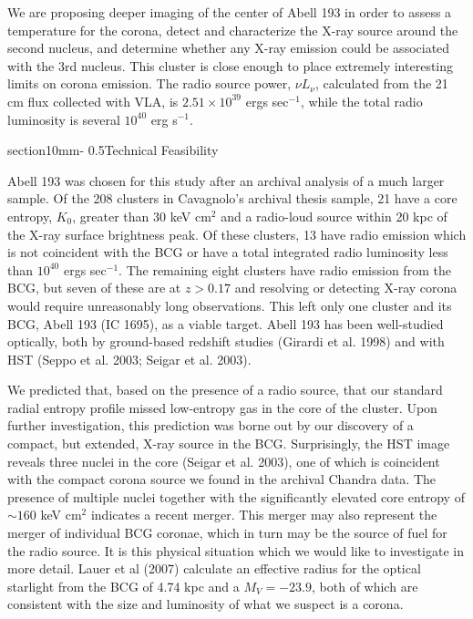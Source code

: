 \documentclass[letterpaper,11pt]{article}
\makeatletter
\renewcommand{\section}{\@startsection%
{section}{1}{0mm}{-\baselineskip}%
{0.5\baselineskip}{\normalfont\Large\bfseries}}%
\makeatother
\begin{document}
We are proposing deeper imaging of the center of Abell 193 in order to
assess a temperature for the corona, detect and characterize the X-ray
source around the second nucleus, and determine whether any X-ray
emission could be associated with the 3rd nucleus. This cluster is
close enough to place extremely interesting limits on corona
emission. The radio source power, $\nu L_\nu$, calculated
from the 21 cm flux collected with VLA, is $2.51\times10^{39}$ ergs
sec$^{-1}$, while the total radio luminosity is several $10^{40}$ erg
s$^{-1}$.

\section{Technical Feasibility}

Abell 193 was chosen for this study after an archival analysis of a
much larger sample. Of the 208 clusters in Cavagnolo's archival thesis
sample, 21 have a core entropy, $K_0$, greater than 30 keV cm$^2$ and
a radio-loud source within 20 kpc of the X-ray surface brightness
peak. Of these clusters, 13 have radio emission which is not
coincident with the BCG or have a total integrated radio luminosity
less than $10^{40}$ ergs sec$^{-1}$. The remaining eight clusters have
radio emission from the BCG, but seven of these are at $z>0.17$ and
resolving or detecting X-ray corona would require unreasonably long
observations. This left only one cluster and its BCG, Abell 193 (IC
1695), as a viable target. Abell 193 has been well-studied optically,
both by ground-based redshift studies (Girardi et al. 1998) and with HST
(Seppo et al. 2003; Seigar et al. 2003). 

We predicted that, based on the presence of a radio source, that our
standard radial entropy profile missed low-entropy gas in the core of
the cluster. Upon further investigation, this prediction was borne out
by our discovery of a compact, but extended, X-ray source in the
BCG. Surprisingly, the HST image reveals three nuclei in the core
(Seigar et al. 2003), one of which is coincident with the compact
corona source we found in the archival Chandra data. The presence of
multiple nuclei together with the significantly elevated core entropy
of $\sim 160$ keV cm$^2$ indicates a recent merger. This merger may
also represent the merger of individual BCG coronae, which in turn may
be the source of fuel for the radio source. It is this physical
situation which we would like to investigate in more detail. Lauer et
al (2007) calculate an effective radius for the optical starlight from
the BCG of 4.74 kpc and a $M_V=-23.9$, both of which are consistent
with the size and luminosity of what we suspect is a corona.
\end{document}
